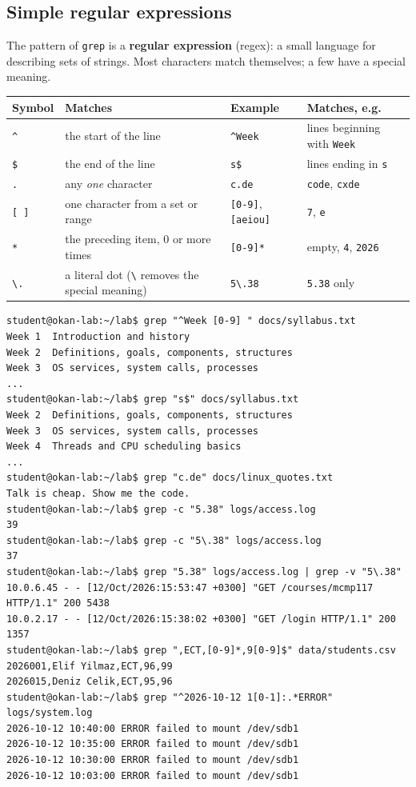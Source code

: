 \documentclass[11pt,a4paper]{article}
\newcommand{\term}[1]{\textbf{\color{mintdeep}#1}}
\newcommand{\cmd}[1]{\texttt{#1}}
\begin{document}
\subsection{Simple regular expressions}

The pattern of \cmd{grep} is a \term{regular expression} (regex): a small language for describing sets of strings. Most characters match themselves; a few have a special meaning.

\begin{center}
\renewcommand{\arraystretch}{1.2}
\begin{tabular}{@{}lp{4.6cm}lp{3.6cm}@{}}
\toprule
\textbf{Symbol} & \textbf{Matches} & \textbf{Example} & \textbf{Matches, e.g.}\\
\midrule
\texttt{\textasciicircum} & the start of the line & \texttt{\textasciicircum Week} & lines beginning with \texttt{Week}\\
\texttt{\$} & the end of the line & \texttt{s\$} & lines ending in \texttt{s}\\
\texttt{.} & any \emph{one} character & \texttt{c.de} & \texttt{code}, \texttt{cxde}\\
\texttt{[ ]} & one character from a set or range & \texttt{[0-9]}, \texttt{[aeiou]} & \texttt{7}, \texttt{e}\\
\texttt{*} & the preceding item, $0$ or more times & \texttt{[0-9]*} & empty, \texttt{4}, \texttt{2026}\\
\texttt{\textbackslash.} & a literal dot (\texttt{\textbackslash} removes the special meaning) & \texttt{5\textbackslash.38} & \texttt{5.38} only\\
\bottomrule
\end{tabular}
\end{center}

\begin{lstlisting}[style=term]
student@okan-lab:~/lab$ grep "^Week [0-9] " docs/syllabus.txt
Week 1  Introduction and history
Week 2  Definitions, goals, components, structures
Week 3  OS services, system calls, processes
...
student@okan-lab:~/lab$ grep "s$" docs/syllabus.txt
Week 2  Definitions, goals, components, structures
Week 3  OS services, system calls, processes
Week 4  Threads and CPU scheduling basics
...
student@okan-lab:~/lab$ grep "c.de" docs/linux_quotes.txt
Talk is cheap. Show me the code.
student@okan-lab:~/lab$ grep -c "5.38" logs/access.log
39
student@okan-lab:~/lab$ grep -c "5\.38" logs/access.log
37
student@okan-lab:~/lab$ grep "5.38" logs/access.log | grep -v "5\.38"
10.0.6.45 - - [12/Oct/2026:15:53:47 +0300] "GET /courses/mcmp117 HTTP/1.1" 200 5438
10.0.2.17 - - [12/Oct/2026:15:38:02 +0300] "GET /login HTTP/1.1" 200 1357
student@okan-lab:~/lab$ grep ",ECT,[0-9]*,9[0-9]$" data/students.csv
2026001,Elif Yilmaz,ECT,96,99
2026015,Deniz Celik,ECT,95,96
student@okan-lab:~/lab$ grep "^2026-10-12 1[0-1]:.*ERROR" logs/system.log
2026-10-12 10:40:00 ERROR failed to mount /dev/sdb1
2026-10-12 10:35:00 ERROR failed to mount /dev/sdb1
2026-10-12 10:30:00 ERROR failed to mount /dev/sdb1
2026-10-12 10:03:00 ERROR failed to mount /dev/sdb1
\end{lstlisting}
\end{document}
